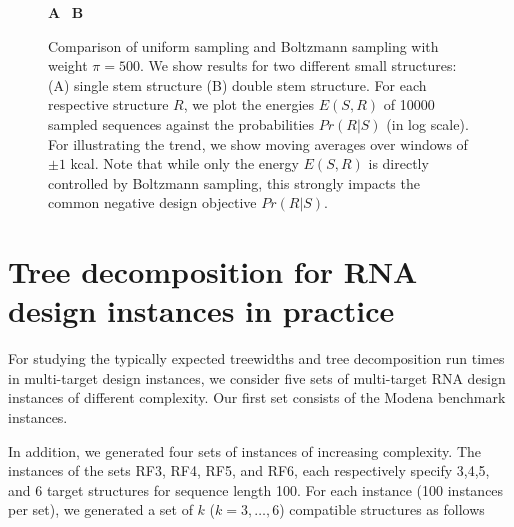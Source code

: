 \documentclass[10pt]{article}
\makeatletter
\newlength{\@aligneps}
\newcommand{\includegraphicstop}[2][]{%
\sbox{\@alignepsbox}{\texttt{[image: \#2]}}%
\setlength{\@aligneps}{-\ht\@alignepsbox}%
\addtolength{\@aligneps}{2ex}%
\raisebox{\@aligneps}{\usebox{\@alignepsbox}}}
\newcommand{\Def}[1]{\emph{#1}}
\makeatother
\begin{document}
% 

\begin{figure}[!h]
\textbf{A}~\includegraphicstop[width=0.48\textwidth]{Figs/Plots/stem_weight1-500_mean}%
\textbf{B}~\includegraphicstop[width=0.48\textwidth]{Figs/Plots/doublestem_weight1-500_mean}%
\caption{Comparison of uniform sampling and Boltzmann sampling with
weight $\pi=500$. We show results for two different small structures: (A) single stem structure (B) double stem structure. For each respective structure $R$, we plot the energies $E(S,R)$ of
10000 sampled sequences against the probabilities $Pr(R|S)$ (in log scale). For illustrating the trend, we show moving averages over windows of $\pm 1$ kcal. Note that while only the energy $E(S,R)$ is directly controlled by Boltzmann sampling, this strongly impacts the common negative design objective $Pr(R|S)$.}
\label{appfig:negforpos}
\end{figure}

\section{Tree decomposition for RNA design instances in practice}
\label{appsec:treedecomp}

For studying the typically expected treewidths and tree decomposition
run times in multi-target design instances, we consider five sets of
multi-target RNA design instances of different complexity. Our first
set consists of the Modena benchmark instances.

In addition, we generated four sets of instances of increasing
complexity. The instances of the sets RF3, RF4, RF5, and RF6, each
respectively specify 3,4,5, and 6 target structures for sequence
length 100.  For each instance (100 instances per set), we generated a
set of $k$ ($k=3,\dots,6$) compatible structures as follows
\end{document}
